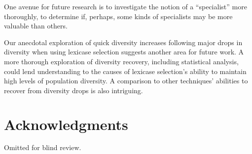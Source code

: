 \documentclass{sig-alternate}
\begin{document}
One avenue for future research is to investigate the notion of a ``specialist'' more thoroughly, to determine if, perhaps, some kinds of specialists may be more valuable than others. 

Our anecdotal exploration of quick diversity increases following major drops in diversity when using lexicase selection suggests another area for future work. A more thorough exploration of diversity recovery, including statistical analysis, could lend understanding to the causes of lexicase selection's ability to maintain high levels of population diversity. A comparison to other techniques' abilities to recover from diversity drops is also intriguing.



\section{Acknowledgments}
Omitted for blind review.

%

%
%
\end{document}
